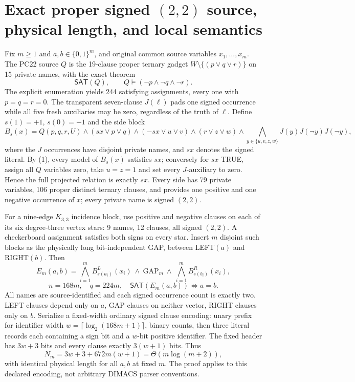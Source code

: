 \documentclass[11pt]{article}
\newcommand{\SAT}{\mathsf{SAT}}
\begin{document}
\section{Exact proper signed $(2,2)$ source, physical length, and local semantics}
Fix $m\ge1$ and $a,b\in\{0,1\}^m$, and original common source variables $x_1,\ldots,x_m$. The PC22 source $Q$ is the 19-clause proper ternary gadget $W\setminus\{(p\vee q\vee r)\}$ on 15 private names, with the exact theorem
\[\SAT(Q),\qquad Q\models(\neg p\land\neg q\land\neg r).\tag{1}\]
The explicit enumeration yields 244 satisfying assignments, every one with $p=q=r=0$. The transparent seven-clause $J(\ell)$ pads one signed occurrence while all five fresh auxiliaries may be zero, regardless of the truth of $\ell$. Define $s(1)=+1$, $s(0)=-1$ and the side block
\[B_s(x)=Q(p,q,r,U)\land(sx\vee p\vee q)\land(-sx\vee u\vee v)\land(r\vee z\vee w)\land\bigwedge_{y\in\{u,v,z,w\}}J(y)J(\neg y)J(\neg y),\tag{2}\]
where the $J$ occurrences have disjoint private names, and $sx$ denotes the signed literal. By (1), every model of $B_s(x)$ satisfies $sx$; conversely for $sx$ TRUE, assign all $Q$ variables zero, take $u=z=1$ and set every $J$-auxiliary to zero. Hence the full projected relation is exactly $sx$. Every side has 79 private variables, 106 proper distinct ternary clauses, and provides one positive and one negative occurrence of $x$; every private name is signed $(2,2)$.

For a nine-edge $K_{3,3}$ incidence block, use positive and negative clauses on each of its six degree-three vertex stars: 9 names, 12 clauses, all signed $(2,2)$. A checkerboard assignment satisfies both signs on every star. Insert $m$ disjoint such blocks as the physically long bit-independent GAP, between LEFT$(a)$ and RIGHT$(b)$. Then
\[E_m(a,b)=\bigwedge_{i=1}^m B_{s(a_i)}^{L}(x_i)\ \land\ \mathrm{GAP}_m\ \land\ \bigwedge_{i=1}^m B_{s(b_i)}^{R}(x_i),\]
\[\boxed{\quad n=168m,\quad q=224m,\quad\SAT(E_m(a,b))\Longleftrightarrow a=b.\quad}\tag{3}\]
All names are source-identified and each signed occurrence count is exactly two. LEFT clauses depend only on $a$, GAP clauses on neither vector, RIGHT clauses only on $b$. Serialize a fixed-width ordinary signed clause encoding: unary prefix for identifier width $w=\lceil\log_2(168m+1)\rceil$, binary counts, then three literal records each containing a sign bit and a $w$-bit positive identifier. The fixed header has $3w+3$ bits and every clause exactly $3(w+1)$ bits. Thus
\[N_m=3w+3+672m(w+1)=\Theta(m\log(m+2)),\tag{4}\]
with identical physical length for all $a,b$ at fixed $m$. The proof applies to this declared encoding, not arbitrary DIMACS parser conventions.
\end{document}
